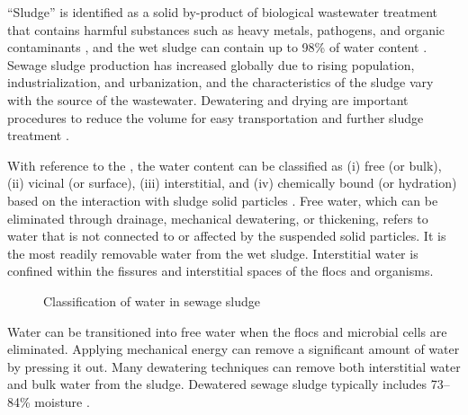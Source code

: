 \begin{sloppypar}
“Sludge” is identified as a solid by-product of biological wastewater treatment that contains harmful substances such as heavy metals, pathogens, and organic contaminants \cite{Wu2020}, and the wet sludge can contain up to 98\% of water content
\cite{Chan2016, SyedHassan2017}. Sewage sludge production has increased globally due to rising population, industrialization, and urbanization, and the characteristics of the sludge vary with the source of the wastewater. Dewatering and drying are important procedures to reduce the volume for easy transportation and further sludge treatment \cite{Chang2023}. 
\end{sloppypar}

With reference to the , the water content can be classified as (i) free (or bulk), (ii) vicinal (or surface), (iii) interstitial, and (iv) chemically bound (or hydration) based on the interaction with sludge solid particles \cite{SyedHassan2017, Qi2020, Vaxelaire2004, Novak2006}. Free water, which can be eliminated through drainage, mechanical dewatering, or thickening, refers to water that is not connected to or affected by the suspended solid particles. It is the most readily removable water from the wet sludge. Interstitial water is confined within the fissures and interstitial spaces of the flocs and organisms.


\begin{figure}[H]
\centering
{}
\caption{Classification of water in sewage sludge}\cite{Qi2020}
\label{fig:Sludge_water}
\end{figure}

Water can be transitioned into free water when the flocs and microbial cells are eliminated. Applying mechanical energy can remove a significant amount of water by pressing it out. Many dewatering techniques can remove both interstitial water and bulk water from the sludge. Dewatered sewage sludge typically includes 73–84\% moisture \cite{Chan2016}.
 
